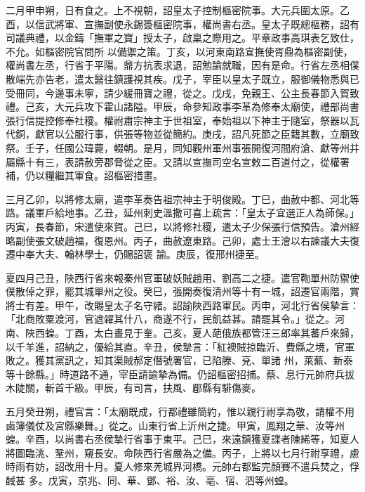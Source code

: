 \begin{pinyinscope}
 二月甲申朔，日有食之。上不視朝，詔皇太子控制樞密院事。大元兵圍太原。乙酉，以信武將軍、宣撫副使永錫簽樞密院事，權尚書右丞。皇太子既總樞務，詔有司議典禮，以金鑄「撫軍之寶」授太子，啟稟之際用之。平章政事高琪表乞致仕，不允。如樞密院官問所
 以備禦之策。丁亥，以河東南路宣撫使胥鼎為樞密副使，權尚書左丞，行省于平陽。鼎方抗表求退，詔勉諭就職，因有是命。行省左丞相僕散端先亦告老，遣太醫往鎮護視其疾。戊子，宰臣以皇太子既立，服御儀物悉與已受冊同，今邊事未寧，請少緩冊寶之禮，從之。戊戌，免親王、公主長春節入賀致禮。己亥，大元兵攻下霍山諸隘。甲辰，命參知政事李革為修奉太廟使，禮部尚書張行信提控修奉社稷。權祔肅宗神主于世祖室，奉始祖以下神主于隨室，祭器以瓦代銅，獻官以公服行事，供張等物並從簡約。庚戌，詔凡死節之臣籍其數，立廟致
 祭。壬子，任國公瑋薨，輟朝。是月，同知觀州軍州事張開復河間府滄、獻等州并屬縣十有三，表請赦旁郡脅從之臣。又請以宣撫司空名宣敕二百道付之，從權署補，仍以糧繼其軍食。詔樞密措畫。



 三月乙卯，以將修太廟，遣李革奏告祖宗神主于明俊殿。丁巳，曲赦中都、河北等路。議軍戶給地事。乙丑，延州刺史溫撒可喜上疏言：「皇太子宜選正人為師保。」丙寅，長春節，宋遣使來賀。己巳，以將修社稷，遣太子少保張行信預告。滄州經略副使張文破趙福，復恩州。丙子，曲赦遼東路。己卯，處士王澮以右諫議大夫復遷中奉大夫、翰林學士，仍賜詔褒
 諭。庚辰，復邢州捷至。



 夏四月己丑，陜西行省來報秦州官軍破妖賊趙用、劉高二之捷。遣官鞫單州防禦使僕散倬之罪，罷其城單州之役。癸巳，張開奏復清州等十有一城，詔遷官兩階，賞將士有差。甲午，改賜皇太子名守緒。詔諭陜西路軍民。丙申，河北行省侯摯言：「北商敗粟渡河，官遮糴其什八，商遂不行，民飢益甚。請罷其令。」從之。河南、陜西蝗。丁酉，太白晝見于奎。己亥，夏人葩俄族都管汪三郎率其蕃戶來歸，以千羊進，詔納之，優給其直。辛丑，侯摯言：「紅襖賊掠臨沂、費縣之境，官軍敗之。獲其黨訊之，知其渠賊郝定僭號署官，已陷滕、兗、單諸
 州，萊蕪、新泰等十餘縣。」時道路不通，宰臣請諭摯為備。仍詔樞密招捕。蔡、息行元帥府兵拔木陡關，斬首千級。甲辰，有司言，扶風、郿縣有騑傷麥。



 五月癸丑朔，禮官言：「太廟既成，行都禮雖簡約，惟以親行祔享為敬，請權不用鹵簿儀仗及宮縣樂舞。」從之。山東行省上沂州之捷。甲寅，鳳翔之華、汝等州蝗。辛酉，以尚書右丞侯摯行省事于東平。己巳，來遠鎮獲夏諜者陳絺等，知夏人將圖臨洮、鞏州，窺長安。命陜西行省嚴為之備。丙子，上將以七月行祔享禮，慮時雨有妨，詔改用十月。夏人修來羌城界河橋。元帥右都監完顏賽不遣兵焚之，俘馘甚
 多。戊寅，京兆、同、華、鄧、裕、汝、亳、宿、泗等州蝗。




\end{pinyinscope}
